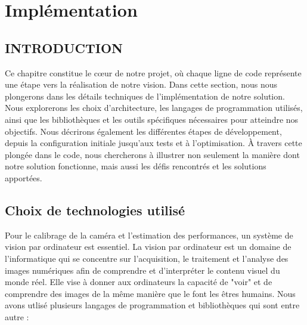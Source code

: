 \chapter{Implémentation}
\begin{spacing}{1.2}
\minitoc
\thispagestyle{MyStyle}
\end{spacing}
\newpage

\section{INTRODUCTION}
Ce chapitre constitue le cœur de notre projet, où chaque ligne de code représente une étape vers la réalisation de notre vision.
Dans cette section, nous nous plongerons dans les détails techniques de l'implémentation de notre solution. Nous explorerons les choix d'architecture, les langages de programmation utilisés, ainsi que les bibliothèques et les outils spécifiques nécessaires pour atteindre nos objectifs. Nous décrirons également les différentes étapes de développement, depuis la configuration initiale jusqu'aux tests et à l'optimisation.
À travers cette plongée dans le code, nous chercherons à illustrer non seulement la manière dont notre solution fonctionne, mais aussi les défis rencontrés et les solutions apportées.  
 
 \section{Choix de technologies utilisé}
 
 Pour le calibrage de la caméra et l'estimation des performances, un système de vision par ordinateur est essentiel. La vision par ordinateur est un domaine de l'informatique qui se concentre sur l'acquisition, le traitement et l'analyse des images numériques afin de comprendre et d'interpréter le contenu visuel du monde réel. Elle vise à donner aux ordinateurs la capacité de "voir" et de comprendre des images de la même manière que le font les êtres humains.
 Nous avons utlisé plusieurs langages de programmation et bibliothèques qui sont entre autre : 
 
